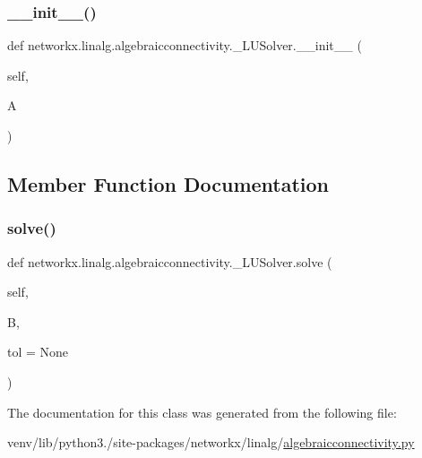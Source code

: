 \subsubsection{\texorpdfstring{\+\_\+\+\_\+init\+\_\+\+\_\+()}{\_\_init\_\_()}}
{\footnotesize\ttfamily def networkx.\+linalg.\+algebraicconnectivity.\+\_\+\+L\+U\+Solver.\+\_\+\+\_\+init\+\_\+\+\_\+ (\begin{DoxyParamCaption}\item[{}]{self,  }\item[{}]{A }\end{DoxyParamCaption})}



\subsection{Member Function Documentation}
\mbox{\label{classnetworkx_1_1linalg_1_1algebraicconnectivity_1_1__LUSolver_add6ed953a6048e2883ff700b2ef71a84}} 
\subsubsection{\texorpdfstring{solve()}{solve()}}
{\footnotesize\ttfamily def networkx.\+linalg.\+algebraicconnectivity.\+\_\+\+L\+U\+Solver.\+solve (\begin{DoxyParamCaption}\item[{}]{self,  }\item[{}]{B,  }\item[{}]{tol = {\ttfamily None} }\end{DoxyParamCaption})}



The documentation for this class was generated from the following file\+:\begin{DoxyCompactItemize}
\item 
venv/lib/python3./site-\/packages/networkx/linalg/\hyperlink{algebraicconnectivity_8py}{algebraicconnectivity.\+py}\end{DoxyCompactItemize}
